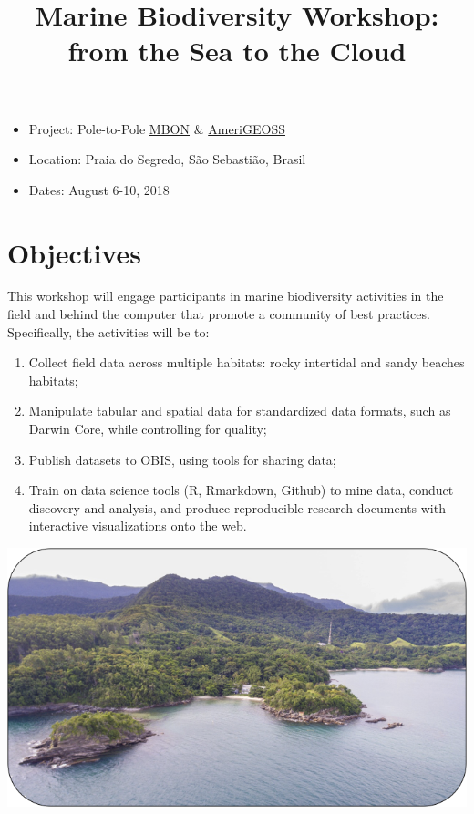 \documentclass[]{book}
\title{Marine Biodiversity Workshop: from the Sea to the Cloud}
\author{}
\date{}
\providecommand{\tightlist}{%
  \setlength{\itemsep}{0pt}\setlength{\parskip}{0pt}}
\theoremstyle{definition}
\theoremstyle{definition}
\theoremstyle{definition}
\theoremstyle{remark}
\begin{document}
\maketitle

{
\setcounter{tocdepth}{1}
\tableofcontents
}
\begin{itemize}
\tightlist
\item
  Project: Pole-to-Pole \href{marinebon.org}{MBON} \&
  \href{https://www.amerigeoss.org}{AmeriGEOSS}
\item
  Location: Praia do Segredo, São Sebastião, Brasil
\item
  Dates: August 6-10, 2018
\end{itemize}

\hypertarget{objectives}{%
\section{Objectives}\label{objectives}}

This workshop will engage participants in marine biodiversity activities
in the field and behind the computer that promote a community of best
practices. Specifically, the activities will be to:

\begin{enumerate}
\def\labelenumi{\arabic{enumi}.}
\tightlist
\item
  Collect field data across multiple habitats: rocky intertidal and
  sandy beaches habitats;
\item
  Manipulate tabular and spatial data for standardized data formats,
  such as Darwin Core, while controlling for quality;
\item
  Publish datasets to OBIS, using tools for sharing data;
\item
  Train on data science tools (R, Rmarkdown, Github) to mine data,
  conduct discovery and analysis, and produce reproducible research
  documents with interactive visualizations onto the web.
\end{enumerate}

\includegraphics{figs/CEBIMar_pic.png}
\end{document}
